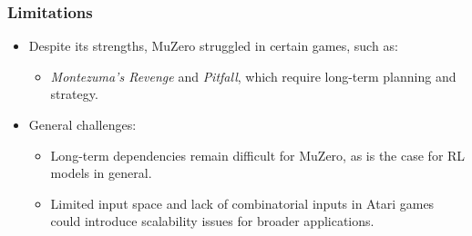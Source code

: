 \subsubsection{Limitations}
\begin{itemize}
    \item Despite its strengths, MuZero struggled in certain games, such as:
          \begin{itemize}
              \item \emph{Montezuma's Revenge} and \emph{Pitfall}, which require long-term planning and strategy.
          \end{itemize}
    \item General challenges:
          \begin{itemize}
              \item Long-term dependencies remain difficult for MuZero, as is the case for RL
                    models in general.
              \item Limited input space and lack of combinatorial inputs in Atari games could
                    introduce scalability issues for broader applications.\cite{mz1}
          \end{itemize}
\end{itemize}



